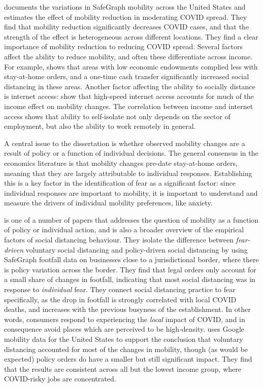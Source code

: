 \documentclass{article}
\begin{document}
\textcite{glaeserHowMuchDoes2020} documents the variations in SafeGraph mobility across the United States and estimates the effect of mobility reduction in moderating COVID spread. They find that mobility reduction significantly decreases COVID cases, and that the strength of the effect is heterogeneous across different locations. They find a clear importance of mobility reduction to reducing COVID spread. Several factors affect the ability to reduce mobility, and often these differentiate across income. For example, \textcite{wrightPovertyEconomicDislocation2020} shows that areas with low economic endowments complied less with stay-at-home orders, and a one-time cash transfer significantly increased social distancing in these areas. Another factor affecting the ability to socially distance is internet access: \textcite{chiouSocialDistancingInternet2020} show that high-speed internet access accounts for much of the income effect on mobility changes. The correlation between income and internet access shows that ability to self-isolate not only depends on the sector of employment, but also the ability to work remotely in general.

A central issue to the dissertation is whether observed mobility changes are a result of policy or a function of individual decisions. The general consensus in the economics literature is that mobility changes pre-date stay-at-home orders, meaning that they are largely attributable to individual responses. Establishing this is a key factor in the identification of fear as a significant factor: since individual responses are important to mobility, it is important to understand and measure the drivers of individual mobility preferences, like anxiety.

\textcite{goolsbeeFearLockdownDiversion2021} is one of a number of papers that addresses the question of mobility as a function of policy or individual action, and is also a broader overview of the empirical factors of social distancing behaviour. They isolate the difference between \textit{fear-driven} voluntary social distancing and policy-driven social distancing by using SafeGraph footfall data on businesses close to a jurisdictional border, where there is policy variation across the border. They find that legal orders only account for a small share of changes in footfall, indicating that most social distancing was in response to \textit{individual} fear. They connect social distancing practice to fear specifically, as the drop in footfall is strongly correlated with local COVID deaths, and increases with the previous busyness of the establishment. In other words, consumers respond to experiencing the \textit{local} impact of COVID, and in consequence avoid places which are perceived to be high-density. \textcite{maloneyDeterminantsSocialDistancing2020} uses Google mobility data for the United States to support the conclusion that voluntary distancing accounted for most of the changes in mobility, though (as would be expected) policy orders do have a smaller but still significant impact. They find that the results are consistent across all but the lowest income group, where COVID-risky jobs are concentrated. 
\end{document}
